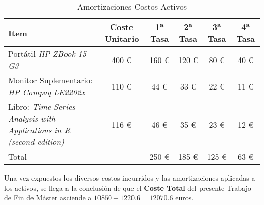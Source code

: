 \begin{table}[htbp]
    \centering
    \begin{tabular}{p{4cm}ccccc}
    \toprule
    Item & Coste Unitario & 1ª Tasa & 2ª Tasa & 3ª Tasa & 4ª Tasa \\
    \midrule
    Portátil \textit{HP ZBook 15 G3} & 400 € & 160 € & 120 € & 80 € & 40 € \\
    Monitor Suplementario: \textit{HP Compaq LE2202x} & 110 € & 44 € & 33 € & 22 € & 11 € \\
    Libro: \textit{Time Series Analysis with Applications in R (second edition)} & 116 € & 46 € & 35 € & 23 € & 12 € \\
    \midrule
    Total & & 250 € & 185 € & 125 € & 63 €  \\
    \bottomrule
    \end{tabular}
    \caption{Amortizaciones Costos Activos}\label{tab:costos-amortizados}
\end{table}

Una vez expuestos los diversos costos incurridos y las amortizaciones aplicadas a los activos, se llega a la conclusión de que el \textbf{Coste Total} del presente Trabajo de Fin de Máster asciende a $10850 + 1220.6 = 12070.6$ euros.

\newpage
